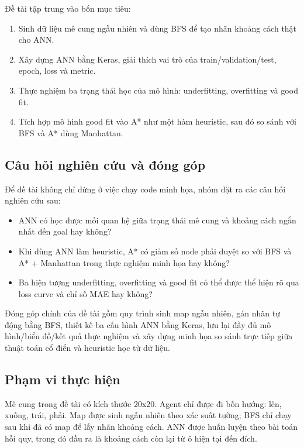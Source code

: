 \documentclass[12pt,a4paper]{article}
\begin{document}
Đề tài tập trung vào bốn mục tiêu:

\begin{enumerate}
    \item Sinh dữ liệu mê cung ngẫu nhiên và dùng BFS để tạo nhãn khoảng cách thật cho ANN.
    \item Xây dựng ANN bằng Keras, giải thích vai trò của train/validation/test, epoch, loss và metric.
    \item Thực nghiệm ba trạng thái học của mô hình: underfitting, overfitting và good fit.
    \item Tích hợp mô hình good fit vào A* như một hàm heuristic, sau đó so sánh với BFS và A* dùng Manhattan.
\end{enumerate}

\subsection{Câu hỏi nghiên cứu và đóng góp}

Để đề tài không chỉ dừng ở việc chạy code minh họa, nhóm đặt ra các câu hỏi nghiên cứu sau:

\begin{itemize}
    \item ANN có học được mối quan hệ giữa trạng thái mê cung và khoảng cách ngắn nhất đến goal hay không?
    \item Khi dùng ANN làm heuristic, A* có giảm số node phải duyệt so với BFS và A* + Manhattan trong thực nghiệm minh họa hay không?
    \item Ba hiện tượng underfitting, overfitting và good fit có thể được thể hiện rõ qua loss curve và chỉ số MAE hay không?
\end{itemize}

Đóng góp chính của đề tài gồm quy trình sinh map ngẫu nhiên, gán nhãn tự động bằng BFS, thiết kế ba cấu hình ANN bằng Keras, lưu lại đầy đủ mô hình/biểu đồ/kết quả thực nghiệm và xây dựng minh họa so sánh trực tiếp giữa thuật toán cổ điển và heuristic học từ dữ liệu.

\subsection{Phạm vi thực hiện}

Mê cung trong đề tài có kích thước 20x20. Agent chỉ được đi bốn hướng: lên, xuống, trái, phải. Map được sinh ngẫu nhiên theo xác suất tường; BFS chỉ chạy sau khi đã có map để lấy nhãn khoảng cách. ANN được huấn luyện theo bài toán hồi quy, trong đó đầu ra là khoảng cách còn lại từ ô hiện tại đến đích.
\end{document}

